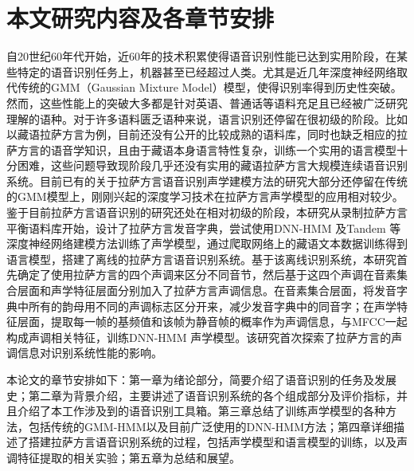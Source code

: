 \section{本文研究内容及各章节安排}
自20世纪60年代开始，近60年的技术积累使得语音识别性能已达到实用阶段，在某些特定的语音识别任务上，机器甚至已经超过人类。尤其是近几年深度神经网络取代传统的GMM（Gaussian Mixture Model）模型，使得识别率得到历史性突破。然而，这些性能上的突破大多都是针对英语、普通话等语料充足且已经被广泛研究理解的语种。对于许多语料匮乏语种来说，语言识别还停留在很初级的阶段。比如以藏语拉萨方言为例，目前还没有公开的比较成熟的语料库，同时也缺乏相应的拉萨方言的语音学知识，且由于藏语本身语言特性复杂，训练一个实用的语言模型十分困难，这些问题导致现阶段几乎还没有实用的藏语拉萨方言大规模连续语音识别系统。目前已有的关于拉萨方言语音识别声学建模方法的研究大部分还停留在传统的GMM模型上，刚刚兴起的深度学习技术在拉萨方言声学模型的应用相对较少。鉴于目前拉萨方言语音识别的研究还处在相对初级的阶段，本研究从录制拉萨方言平衡语料库开始，设计了拉萨方言发音字典，尝试使用DNN-HMM 及Tandem 等深度神经网络建模方法训练了声学模型，通过爬取网络上的藏语文本数据训练得到语言模型，搭建了离线的拉萨方言语音识别系统。基于该离线识别系统，本研究首先确定了使用拉萨方言的四个声调来区分不同音节，然后基于这四个声调在音素集合层面和声学特征层面分别加入了拉萨方言声调信息。在音素集合层面，将发音字典中所有的韵母用不同的声调标志区分开来，减少发音字典中的同音字；在声学特征层面，提取每一帧的基频值和该帧为静音帧的概率作为声调信息，与MFCC一起构成声调相关特征，训练DNN-HMM 声学模型。该研究首次探索了拉萨方言的声调信息对识别系统性能的影响。

本论文的章节安排如下：第一章为绪论部分，简要介绍了语音识别的任务及发展史；第二章为背景介绍，主要讲述了语音识别系统的各个组成部分及评价指标，并且介绍了本工作涉及到的语音识别工具箱。第三章总结了训练声学模型的各种方法，包括传统的GMM-HMM以及目前广泛使用的DNN-HMM方法；第四章详细描述了搭建拉萨方言语音识别系统的过程，包括声学模型和语言模型的训练，以及声调特征提取的相关实验；第五章为总结和展望。
